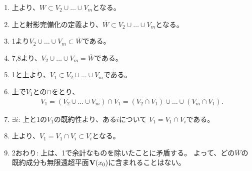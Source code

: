 \begin{myproof}
\begin{enumerate}
    \item
    上より、$W \subset V_2\cup \dots \cup V_m$となる。
    \item
    上と射影完備化の定義より、$\overline W \subset V_2\cup \dots \cup V_m$となる。
    \item
    1より$V_2 \cup \dots \cup V_m\subset \overline W$である。
    \item
    7,8より、$V_2 \cup \dots \cup V_m = \overline W$である。
    \item
    1と上より、$V_1 \subset V_2 \cup \dots \cup V_m$である。
    \item
    上で$V_1$との$\cap$をとり、
    \begin{align}
      V_1 = (V_2 \cup \dots \cup V_m) \cap V_1
      =
      (V_2 \cap V_1)\cup \dots \cup(V_m \cap V_1).
    \end{align}
    \item $\exists i$:
    上と1の$V_1$の既約性より、ある$i$について $V_1 = V_1 \cap V_i$である。
    \item
    上より、$V_1 = V_1 \cap V_i \subset V_i$となる。
    \item 2おわり:
    上は、1で余計なものを除いたことに矛盾する。
    よって、どの$\overline W$の既約成分も無限遠超平面$\textbf V(x_0)$に含まれることはない。
  \end{enumerate}

\end{myproof}

